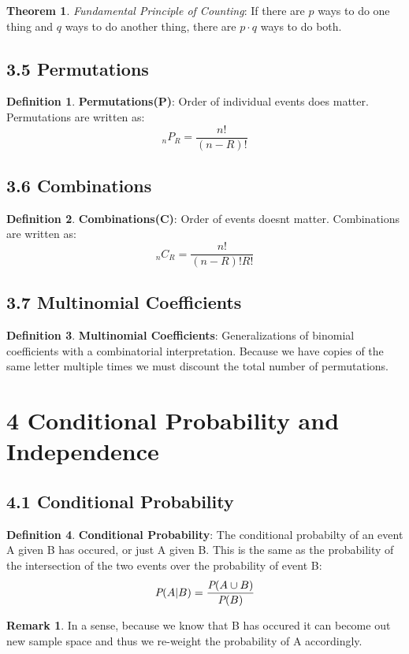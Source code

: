 \documentclass[12pt]{amsart}
\theoremstyle{definition}
\newtheorem{theorem}{Theorem}  %
\newtheorem{definition}{Definition} %
\newtheorem*{remark}{Remark}        %
\numberwithin{equation}{theorem}    %
\begin{document}
\begin{theorem}
    \textit{Fundamental Principle of Counting}:
    If there are $p$ ways to do one thing and $q$ ways to do another thing, there are $p \cdot q$ ways to do both. 
\end{theorem}

\subsection*{3.5 Permutations}
\begin{definition}
    \textbf{Permutations(P)}:
    Order of individual events does matter. Permutations are written as: $$_nP_R = \frac{n!}{(n-R)!}$$
\end{definition}

\subsection*{3.6 Combinations}

\begin{definition}
    \textbf{Combinations(C)}:
    Order of events doesnt matter. Combinations are written as:
    $$_nC_R = \frac{n!}{(n-R)!R!}$$ 
\end{definition}

\subsection*{3.7 Multinomial Coefficients}

\begin{definition}
    \textbf{Multinomial Coefficients}:
    Generalizations of binomial coefficients with a combinatorial interpretation. Because we have copies of the same letter multiple times we must discount the total number of permutations. 
     
\end{definition}

\section*{4 Conditional Probability and Independence}

\subsection*{4.1 Conditional Probability}

\begin{definition}
    \textbf{Conditional Probability}:
    The conditional probabilty of an event A given B has occured, or just A given B. This is the same as the probability of the intersection of the two events over the probability of event B:
    $$\emph{P}(A|B) = \frac{\emph{P}(A \cup B)}{\emph{P}(B)}$$
    \begin{remark}
        In a sense, because we know that B has occured it can become out new sample space and thus we re-weight the probability of A accordingly.
    \end{remark}
\end{definition}
\end{document}
